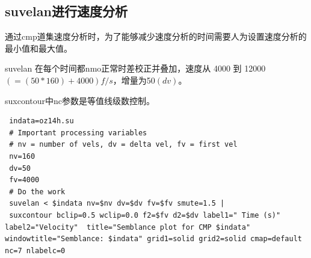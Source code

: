 \subsection{suvelan进行速度分析}
通过cmp道集速度分析时，为了能够减少速度分析的时间需要人为设置速度分析的最小值和最大值。\par
suvelan 在每个时间都nmo正常时差校正并叠加，速度从 4000 到 12000 $(=(50*160)+4000 ) f/s$，增量为50$(dv)$。\par
suxcontour中nc参数是等值线级数控制。
\begin{lstlisting}
 indata=oz14h.su
 # Important processing variables
 # nv = number of vels, dv = delta vel, fv = first vel
 nv=160
 dv=50
 fv=4000
 # Do the work
 suvelan < $indata nv=$nv dv=$dv fv=$fv smute=1.5 |
 suxcontour bclip=0.5 wclip=0.0 f2=$fv d2=$dv label1=" Time (s)" label2="Velocity"  title="Semblance plot for CMP $indata" windowtitle="Semblance: $indata" grid1=solid grid2=solid cmap=default nc=7 nlabelc=0 
\end{lstlisting}

